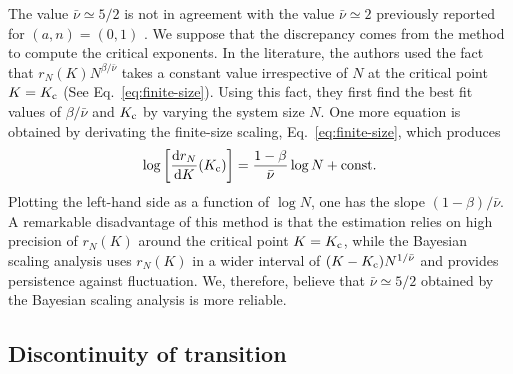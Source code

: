 The value $\bar{\nu}\simeq 5/2$ is not in agreement
with the value $\bar{\nu}\simeq 2$ previously reported
for $(a,n)=(0,1)$ \cite{hong2002}.
We suppose that the discrepancy comes from the method
to compute the critical exponents.
In the literature, the authors used the fact
that $r_{N}(K)N^{\beta/\bar{\nu}}$ takes a constant value
irrespective of $N$ at the critical point $K=K_{\rm c}$
(See Eq.~\eqref{eq:finite-size}). Using this fact,
they first find the best fit values of $\beta/\bar{\nu}$ and $K_{\rm c}$
by varying the system size $N$. One more equation is obtained
by derivating the finite-size scaling, Eq.~\eqref{eq:finite-size},
which produces
\begin{equation}
  \log\left[ \frac{\mathrm{d} r_{N}}{\mathrm{d} K}(K_{\mathrm{c}}) \right]
  = \dfrac{1-\beta}{\bar{\nu}} \log N + \mathrm{const.}
\end{equation}
Plotting the left-hand side as a function of $\log N$,
one has the slope $(1-\beta)/\bar{\nu}$.
A remarkable disadvantage of this method is that
the estimation relies on high precision of $r_{N}(K)$
around the critical point $K=K_{\rm c}$,
while the Bayesian scaling analysis uses $r_{N}(K)$
in a wider interval of $(K-K_{\rm c})N^{1/\bar{\nu}}$
and provides persistence against fluctuation.
We, therefore, believe that $\bar{\nu}\simeq 5/2$
obtained by the Bayesian scaling analysis is more reliable.


\subsection{Discontinuity of transition}

